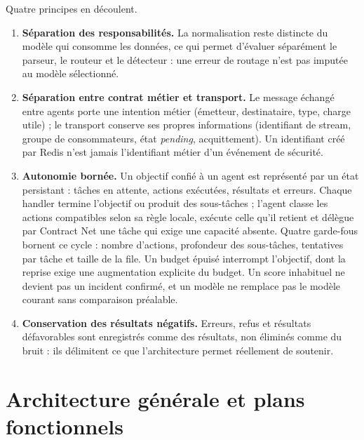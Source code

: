 Quatre principes en découlent.
\begin{enumerate}
    \item \textbf{Séparation des responsabilités.} La normalisation reste distincte du modèle qui consomme les données, ce qui permet d'évaluer séparément le parseur, le routeur et le détecteur : une erreur de routage n'est pas imputée au modèle sélectionné.
    \item \textbf{Séparation entre contrat métier et transport.} Le message échangé entre agents porte une intention métier (émetteur, destinataire, type, charge utile) ; le transport conserve ses propres informations (identifiant de stream, groupe de consommateurs, état \textit{pending}, acquittement). Un identifiant créé par Redis n'est jamais l'identifiant métier d'un événement de sécurité.
    \item \textbf{Autonomie bornée.} Un objectif confié à un agent est représenté par un état persistant : tâches en attente, actions exécutées, résultats et erreurs. Chaque handler termine l'objectif ou produit des sous-tâches ; l'agent classe les actions compatibles selon sa règle locale, exécute celle qu'il retient et délègue par Contract Net une tâche qui exige une capacité absente. Quatre garde-fous bornent ce cycle : nombre d'actions, profondeur des sous-tâches, tentatives par tâche et taille de la file. Un budget épuisé interrompt l'objectif, dont la reprise exige une augmentation explicite du budget. Un score inhabituel ne devient pas un incident confirmé, et un modèle ne remplace pas le modèle courant sans comparaison préalable.
    \item \textbf{Conservation des résultats négatifs.} Erreurs, refus et résultats défavorables sont enregistrés comme des résultats, non éliminés comme du bruit : ils délimitent ce que l'architecture permet réellement de soutenir.
\end{enumerate}

\section{Architecture générale et plans fonctionnels}

\label{sec:architecture-generale}


